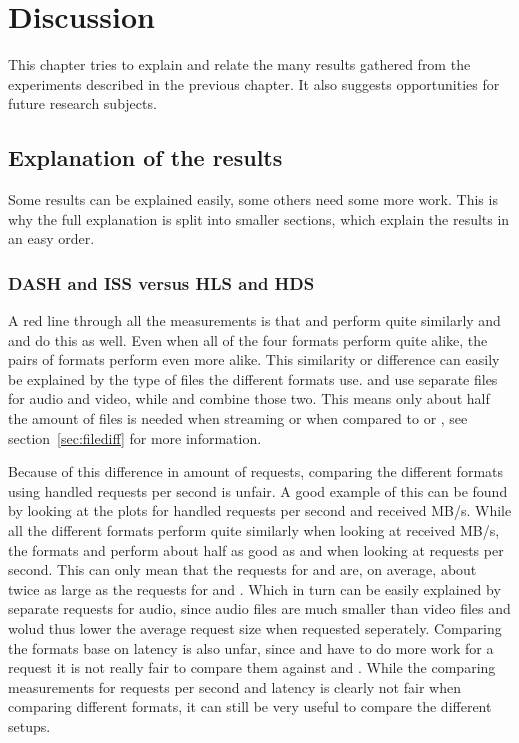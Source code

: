 \documentclass[twoside,openright]{uva-bachelor-thesis}
\begin{document}
\chapter{Discussion}
This chapter tries to explain and relate the many results gathered from the
experiments described in the previous chapter. It also suggests opportunities for
future research subjects.

\section{Explanation of the results}
Some results can be explained easily, some others need some more
work. This is why the full explanation is split into smaller sections, which
explain the results in an easy order.


\subsection{DASH and ISS versus HLS and HDS}\label{sec:audiovs}
A red line through all the measurements is that \hls and \hds perform
quite similarly and \dash and \iss do this as well. Even when all of the four
formats perform quite alike, the pairs of formats perform even more alike.
This similarity or difference can easily be explained by the type of files the
different formats use. \dash and \iss use
separate files for audio and video, while \hls and \hds combine those two. This
means only about half the amount of files is needed when streaming \hls or \hds
when compared to \dash or \iss, see section~\ref{sec:filediff} for more
information.

Because of this difference in amount of requests, comparing the different
formats using handled requests per second is unfair. A good example of
this can be found by looking at the plots for handled requests per second and
received MB/s. While all the different formats perform quite similarly when
looking at received MB/s, the formats \hls and \hds perform about half as good as
\dash and \iss when looking at requests per second. This can only mean that the
requests for \hds and \hls are, on average, about twice as large as the requests
for \dash and \iss. Which in turn can be easily explained by separate requests
for audio, since audio files are much smaller than video files and wolud thus
lower the average request size when requested seperately. Comparing the formats
base on latency is also unfar, since \hls and \hds have to do more work for a
request it is not really fair to compare them against \dash and \iss. While the
comparing measurements for requests per second and latency is clearly not fair
when comparing different formats, it can still be very useful to compare the
different setups.
\end{document}
